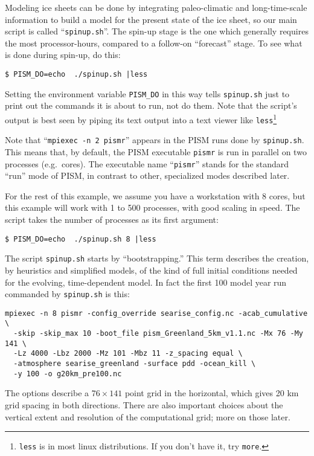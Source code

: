Modeling ice sheets can be done by integrating paleo-climatic and long-time-scale information to build a model for the present state of the ice sheet, so our main script is called ``\texttt{spinup.sh}''.  The spin-up stage is the one which generally requires the most processor-hours, compared to a follow-on ``forecast'' stage.  To see what is done during spin-up, do this:
\begin{verbatim}
$ PISM_DO=echo  ./spinup.sh |less
\end{verbatim}
Setting the environment variable \texttt{PISM_DO} in this way tells \texttt{spinup.sh} just to print out the commands it is about to run, not do them.  Note that the script's output is best seen by piping its text output into a text viewer like \texttt{less}\footnote{\texttt{less} is in most linux distributions.  If you don't have it, try \texttt{more}.}

Note that ``\texttt{mpiexec -n 2 pismr}'' appears in the PISM runs done by \texttt{spinup.sh}.  This means that, by default, the PISM executable \texttt{pismr} is run in parallel on two processes (e.g.~cores).  The executable name ``\texttt{pismr}'' stands for the standard ``run'' mode of PISM, in contrast to other, specialized modes described later.

For the rest of this example, we assume you have a workstation with 8 cores, but this example will work with 1 to 500 processes, with good scaling in speed.  The script takes the number of processes as its first argument:
\begin{verbatim}
$ PISM_DO=echo  ./spinup.sh 8 |less
\end{verbatim}

The script \texttt{spinup.sh} starts by ``bootstrapping.''  This term describes the creation, by heuristics and simplified models, of the kind of full initial conditions needed for the evolving, time-dependent model.  In fact the first 100 model year run commanded by \texttt{spinup.sh} is this:
\small
\begin{verbatim}
mpiexec -n 8 pismr -config_override searise_config.nc -acab_cumulative \
  -skip -skip_max 10 -boot_file pism_Greenland_5km_v1.1.nc -Mx 76 -My 141 \
  -Lz 4000 -Lbz 2000 -Mz 101 -Mbz 11 -z_spacing equal \
  -atmosphere searise_greenland -surface pdd -ocean_kill \
  -y 100 -o g20km_pre100.nc
\end{verbatim}
\normalsize
The options describe a $76\times 141$ point grid in the horizontal, which gives 20 km grid spacing in both directions.  There are also important choices about the vertical extent and resolution of the computational grid; more on those later. 

